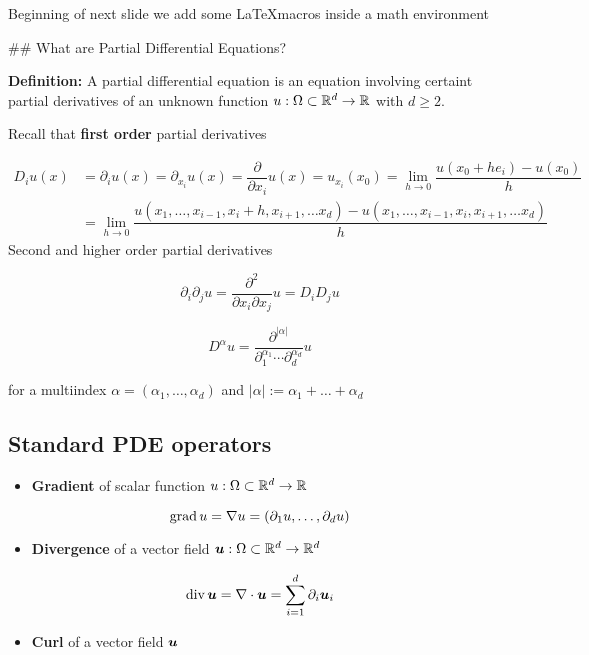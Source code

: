 \documentclass[11pt]{article}
\providecommand{\tightlist}{%
      \setlength{\itemsep}{0pt}\setlength{\parskip}{0pt}}
\begin{document}
    Beginning of next slide we add some \LaTeX macros inside a math
environment

\#\# What are Partial Differential Equations?

\textbf{Definition:} A partial differential equation is an equation
involving certaint partial derivatives of an unknown function
\(u: \Omega \subset \mathbb{R}^d \to \mathbb{R}\) with \(d \geqslant 2\).

Recall that \textbf{first order} partial derivatives

\begin{align*}
  D_i u(x) &=
 \partial_i u(x) =
 \partial_{x_i} u(x) =
 \dfrac{\partial}{\partial x_i} u(x) =
  u_{x_i}(x_0)=
             \lim_{h\to 0} \dfrac{u(x_0 + h e_i) - u(x_0)}{h}
             \\
             &=
  \lim_{h\to 0} \dfrac{
  u(x_1,\ldots,x_{i-1},x_i + h,x_{i+1},\ldots x_d) -
  u(x_1,\ldots,x_{i-1},x_i,x_{i+1},\ldots x_d)}{h}
\end{align*}
Second and higher order partial derivatives

\[
\partial_i \partial_j u = \dfrac{\partial^2}{\partial x_i \partial x_j}u
= D_i D_j u
\]

\[ D^{\alpha} u = 
\dfrac{\partial^{|\alpha|}}{\partial_1^{\alpha_1}\cdots\partial_d^{\alpha_d}} u
\]

for a multiindex \(\alpha = (\alpha_1, \ldots, \alpha_d)\) and
\(|\alpha| := \alpha_1 + \ldots + \alpha_d\)

    \subsection{Standard PDE operators}\label{standard-pde-operators}

\begin{itemize}
\tightlist
\item
  {\bf Gradient} of scalar function \(u: \Omega \subset \mathbb{R}^d \to \mathbb{R}\)
\end{itemize}

\[
\operatorname{grad} u = \nabla u = \left( \partial_1 u, \ldots, \partial_d u \right)
\]

\begin{itemize}
\tightlist
\item
  {\bf Divergence} of a vector field
  \(\boldsymbol u: \Omega \subset \mathbb{R}^d \to \mathbb{R}^d\)
\end{itemize}

\[
\operatorname{div} \boldsymbol u = \nabla \cdot \boldsymbol u = \sum_{i=1}^d \partial_i \boldsymbol u_i
\]

\begin{itemize}
\tightlist
\item
  {\bf Curl } of a vector field \(\boldsymbol u\)
\end{itemize}
\end{document}
